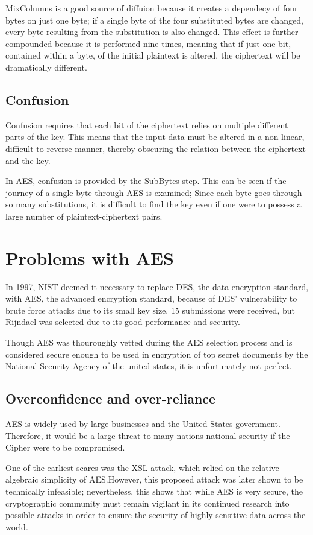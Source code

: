 \documentclass[12pt]{report}
\begin{document}
MixColumns is a good source of diffuion because it creates a dependecy of four bytes on just one byte; if a single byte of the four substituted bytes are changed, every byte resulting from the substitution is also changed. This effect is further compounded because it is performed nine times, meaning that if just one bit, contained within a byte, of the initial plaintext is altered, the ciphertext will be dramatically different.

\subsection{Confusion}
Confusion requires that each bit of the ciphertext relies on multiple different parts of the key. This means that the input data must be altered in a non-linear, difficult to reverse manner, thereby obscuring the relation between the ciphertext and the key\cite{Confusion}.

In AES, confusion is provided by the SubBytes step. This can be seen if the journey of a single byte through AES is examined; Since each byte goes through so many substitutions, it is difficult to find the key even if one were to possess a large number of plaintext-ciphertext pairs.

\section{Problems with AES}
In 1997, NIST deemed it necessary to replace DES, the data encryption standard, with AES, the advanced encryption standard, because of DES' vulnerability to brute force attacks due to its small key size. 15 submissions were received, but Rijndael was selected due to its good performance and security\cite{AESSelection}.

Though AES was thouroughly vetted during the AES selection process and is considered secure enough to be used in encryption of top secret documents by the National Security Agency\cite{CNSSPolicy} of the united states, it is unfortunately not perfect.

\subsection{Overconfidence and over-reliance}
AES is widely used by large businesses and the United States government. Therefore, it would be a large threat to many nations national security if the Cipher were to be compromised.

One of the earliest scares was the XSL attack, which relied on the relative algebraic simplicity of AES\cite{XSL}.However, this proposed attack was later shown to be technically infeasible\cite{XLSRebuked}; nevertheless, this shows that while AES is very secure, the cryptographic community must remain vigilant in its continued research into possible attacks in order to ensure the security of highly sensitive data across the world.
\end{document}
